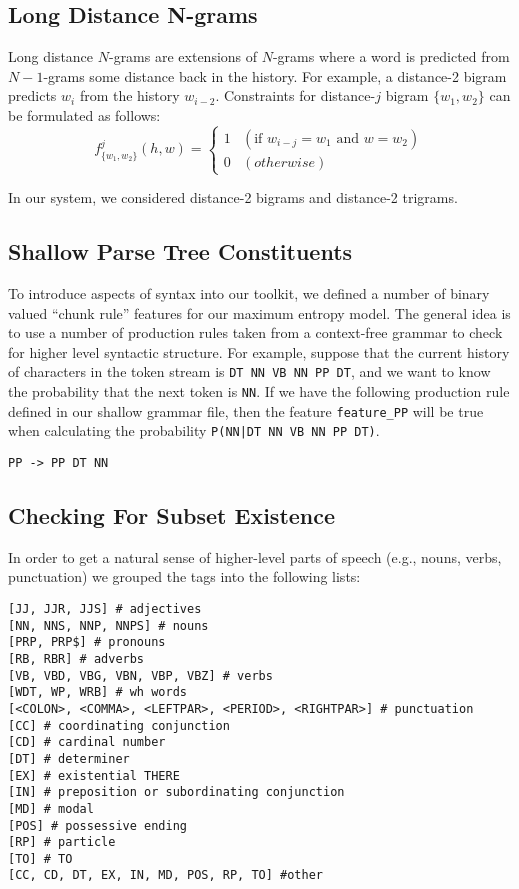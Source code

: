 \documentclass[11pt]{article}
\begin{document}
\subsection{Long Distance N-grams}

Long distance $N$-grams are extensions of $N$-grams where a word is predicted from $N-1$-grams some distance back in the history.
For example, a distance-2 bigram predicts $w_i$ from the history $w_{i-2}$.
Constraints for distance-$j$ bigram $\{w_1, w_2\}$ can be formulated as follows:
\[
  f_{\{w_1, w_2\}}^{j}(h, w) = \begin{cases}
    1 & (\textrm{if } w_{i-j} = w_1 \textrm{ and } w = w_2) \\
    0 & (otherwise)
  \end{cases}
\]

\noindent
In our system, we considered distance-2 bigrams and distance-2 trigrams.

\subsection{Shallow Parse Tree Constituents}

To introduce aspects of syntax into our toolkit, we defined a number of
binary valued ``chunk rule'' features for our maximum entropy model. The
general idea is to use a number of production rules taken from a
context-free grammar to check for higher level syntactic structure. For
example, suppose that the current history of characters in the token
stream is \texttt{DT NN VB NN PP DT}, and we want to know the
probability that the next token is \texttt{NN}. If we have the following
production rule defined in our shallow grammar file, then the feature
\texttt{feature\_PP} will be true when calculating the probability
\texttt{P(NN|DT NN VB NN PP DT)}.

\begin{verbatim}
PP -> PP DT NN
\end{verbatim}

\subsection{Checking For Subset Existence}

In order to get a natural sense of higher-level parts of speech (e.g., nouns, verbs, punctuation) we grouped the tags into the following lists:

\begin{verbatim}
[JJ, JJR, JJS] # adjectives
[NN, NNS, NNP, NNPS] # nouns
[PRP, PRP$] # pronouns
[RB, RBR] # adverbs
[VB, VBD, VBG, VBN, VBP, VBZ] # verbs
[WDT, WP, WRB] # wh words
[<COLON>, <COMMA>, <LEFTPAR>, <PERIOD>, <RIGHTPAR>] # punctuation
[CC] # coordinating conjunction
[CD] # cardinal number
[DT] # determiner
[EX] # existential THERE
[IN] # preposition or subordinating conjunction
[MD] # modal
[POS] # possessive ending
[RP] # particle
[TO] # TO
[CC, CD, DT, EX, IN, MD, POS, RP, TO] #other
\end{verbatim}
\end{document}
